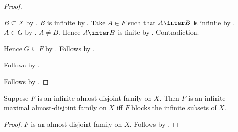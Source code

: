 \begin{proof}
\begin{subproof}
\begin{subproof}
\begin{subproof}
\begin{byCase}
                        $B\subseteq X$
                            by .
                        $B$ is infinite
                            by .
                        Take $A\in F$ such that $A\inter B$ is infinite
                            by .
                        $A\in G$ by .
                        $A\neq B$.
                        Hence $A\inter B$ is finite by
                            .
                        Contradiction.
                \end{byCase}
            \end{subproof}
            Hence $G\subseteq F$ by .
            Follows by .
        \end{subproof}
        Follows by .
    \end{subproof}
    Follows by \auto.
\end{proof}

\begin{corollary}\label{mad_iff_blocking}
    Suppose $F$ is an infinite almost-disjoint family on $X$.
    Then $F$ is an infinite maximal almost-disjoint family on $X$ iff
        $F$ blocks the infinite subsets of $X$.
\end{corollary}
\begin{proof}
    $F$ is an almost-disjoint family on $X$.
    Follows by
        .
\end{proof}

